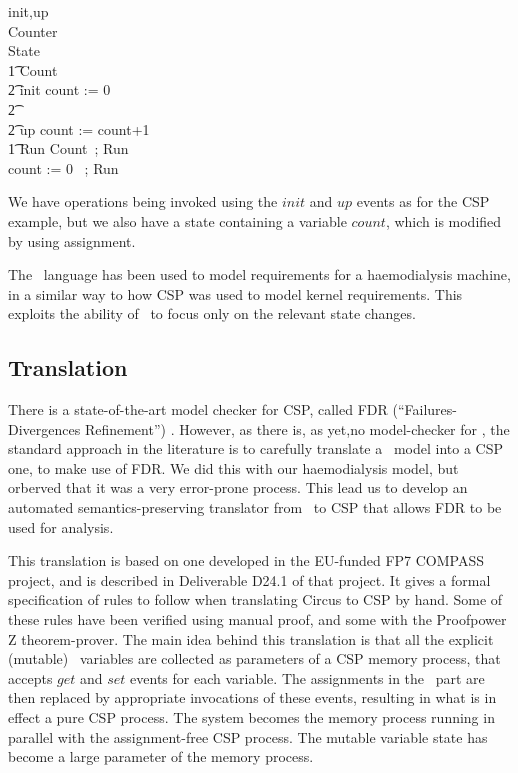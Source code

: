 \begin{circus}
\circchannel init,up \\
\circprocess Counter  \circbegin \\
\circstate State  \\
\t1 Count  \\
\t2 init \then count := 0 \\
\t2 \extchoice \\
\t2 up \then count := count+1 \\
\t1 Run  Count~; Run \\
{} \bullet count := 0 ~; Run \\
\circend
\end{circus}

We have operations being invoked using the $init$ and $up$ events
as for the CSP example, but we also have a state containing a variable $count$,
which is modified by using assignment.


The \Circus\ language has been used to model requirements
for a haemodialysis machine\cite{DBLP:conf/asm/GomesB16},
in a similar way to how CSP was used to model kernel requirements.
This exploits the ability of \Circus\ to focus only on the relevant state changes.

\subsection{Translation}

There is a state-of-the-art model checker for CSP, called FDR
(``Failures-Divergences Refinement'') \cite{FDR3}.
However, as there is, as yet,no model-checker for \Circus,
the standard approach in the literature is to carefully translate
a \Circus\ model into a CSP one, to make use of FDR.
We did this with our haemodialysis model\cite{DBLP:conf/asm/GomesB16},
but orberved that it was a very error-prone process.
This lead us to develop an automated semantics-preserving
translator from \Circus\ to CSP
that allows FDR to be used for analysis.

This translation is based on one developed in the EU-funded FP7 COMPASS project,
and is described in Deliverable D24.1 of that project\cite{compassd241}.
It gives a formal specification of rules to follow when
translating  Circus to CSP by hand.
Some of these rules have been verified using manual proof,
and some with the Proofpower Z theorem-prover\cite{PPZRM}.
The main idea behind this translation is that
all the explicit (mutable) \Circus\ variables are collected as parameters
of a CSP memory process, that accepts $get$ and $set$ events
for each variable. The assignments in the \Circus\ part
are then replaced by appropriate invocations of these events,
resulting in what is in effect a pure CSP process.
The system becomes the memory process running in parallel with the
assignment-free CSP process.
The mutable variable state has become a large parameter of the memory process.

